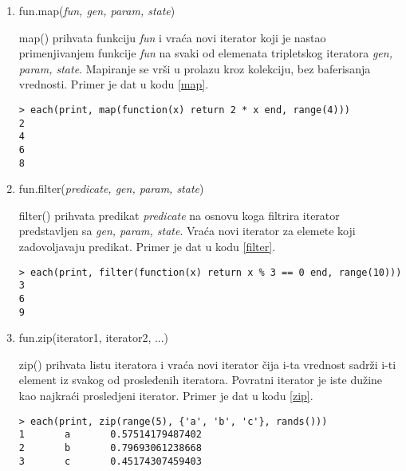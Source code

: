 \documentclass[a4paper]{article}
\begin{document}
\begin{enumerate}
  \item  fun.map(\textit{fun, gen, param, state})
  
  map() prihvata funkciju \textit{fun} i vraća novi iterator koji je nastao primenjivanjem funkcije \textit{fun} na svaki od elemenata tripletskog iteratora \textit{gen, param, state}. Mapiranje se vrši u prolazu kroz kolekciju, bez baferisanja vrednosti. Primer je dat u kodu \ref{map}. \cite{luafun}
   \begin{lstlisting}[caption={Primer funkcije map()},frame=single, label=map]
> each(print, map(function(x) return 2 * x end, range(4)))
2
4
6
8
\end{lstlisting}
  \item fun.filter(\textit{predicate, gen, param, state})
  
  filter() prihvata predikat \textit{predicate} na osnovu koga filtrira iterator predstavljen sa \textit{gen, param, state}. Vraća novi iterator za elemete koji zadovoljavaju predikat. Primer je dat u kodu \ref{filter}. \cite{luafun}
   \begin{lstlisting}[caption={Primer funkcije filter()},frame=single, label=filter]
> each(print, filter(function(x) return x % 3 == 0 end, range(10)))
3
6
9
\end{lstlisting}
\item fun.zip(iterator1, iterator2, ...)

   zip() prihvata listu iteratora i vraća novi iterator čija i-ta vrednost sadrži i-ti element iz svakog od prosleđenih iteratora. Povratni iterator je iste dužine kao najkraći prosledjeni iterator. Primer je dat u kodu \ref{zip}. \cite{luafun}
   \begin{lstlisting}[caption={Primer funkcije zip()},frame=single, label=zip]
> each(print, zip(range(5), {'a', 'b', 'c'}, rands()))
1       a       0.57514179487402
2       b       0.79693061238668
3       c       0.45174307459403
\end{lstlisting}
\end{enumerate}
\end{document}
